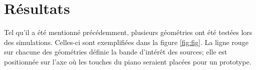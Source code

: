 \documentclass[conference]{IEEEtran}
\begin{document}
\section{Résultats}
Tel qu'il a été mentionné précédemment, plusieurs géométries ont été testées lors des
simulations. Celles-ci sont exemplifiées dans la figure \ref{fig:fig}. La ligne rouge
sur chacune des géométries définie la bande d'intérêt des sources; elle est positionnée
sur l'axe où les touches du piano seraient placées pour un prototype.
\end{document}
